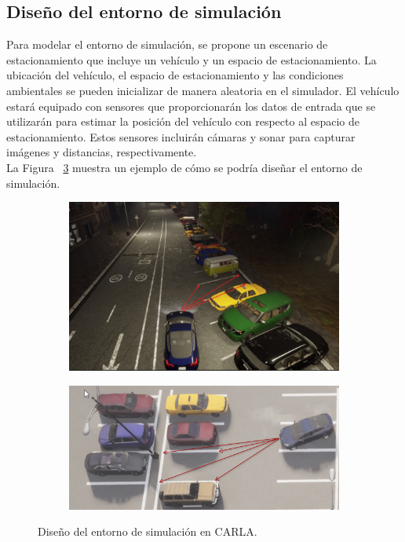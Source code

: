 \subsection{Diseño del entorno de simulación}\label{subsec:simulation-design}
Para modelar el entorno de simulación, se propone un escenario de estacionamiento que incluye un vehículo y un espacio de estacionamiento.
La ubicación del vehículo, el espacio de estacionamiento y las condiciones ambientales se pueden inicializar de manera aleatoria en el simulador.
El vehículo estará equipado con sensores que proporcionarán los datos de entrada que se utilizarán para estimar la posición del vehículo con respecto al espacio de estacionamiento.
Estos sensores incluirán cámaras y sonar para capturar imágenes y distancias, respectivamente.\\
La Figura ~\ref{fig:simulation-design} muestra un ejemplo de cómo se podría diseñar el entorno de simulación.

\begin{figure}[!ht]
    \centering
    \begin{subfigure}{0.4\textwidth}
        \includegraphics[width=\textwidth]{img/distances}\label {fig:distances}
    \end{subfigure}
    \begin{subfigure}{0.4\textwidth}
        \includegraphics[width=\textwidth]{img/distances2}\label {fig:distances2}
    \end{subfigure}
    
    \caption{Diseño del entorno de simulación en CARLA.}
    \label{fig:simulation-design}
\end{figure}

